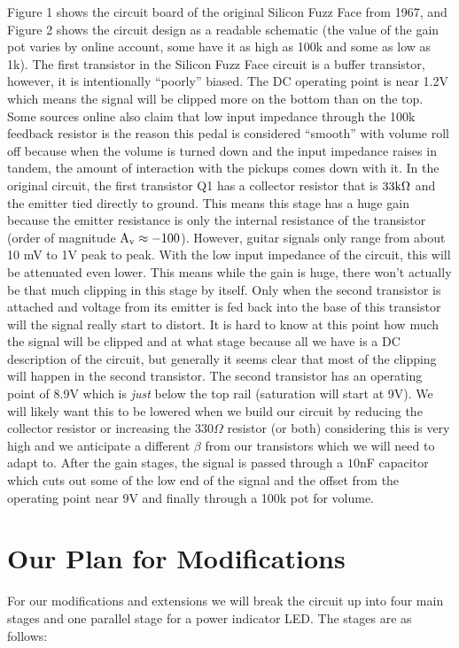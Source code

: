 \documentclass[11pt,twocolumn]{article}
\begin{document}
Figure 1 shows the circuit board of the original Silicon Fuzz Face from 1967, and Figure 2 shows the circuit design as a readable schematic (the value of the gain pot varies by online account, some have it as high as 100k and some as low as 1k). The first transistor in the Silicon Fuzz Face circuit is a buffer transistor, however, it is intentionally ``poorly'' biased. The DC operating point is near 1.2V which means the signal will be clipped more on the bottom than on the top. Some sources online also claim that low input impedance through the 100k feedback resistor is the reason this pedal is considered ``smooth'' with volume roll off because when the volume is turned down and the input impedance raises in tandem, the amount of interaction with the pickups comes down with it. In the original circuit, the first transistor Q1 has a collector resistor that is $\rm 33k\Omega$ and the emitter tied directly to ground. This means this stage has a huge gain because the emitter resistance is only the internal resistance of the transistor (order of magnitude $\rm A_v\approx -100$). However, guitar signals only range from about 10 mV to 1V peak to peak. With the low input impedance of the circuit, this will be attenuated even lower. This means while the gain is huge, there won't actually be that much clipping in this stage by itself. Only when the second transistor is attached and voltage from its emitter is fed back into the base of this transistor will the signal really start to distort. It is hard to know at this point how much the signal will be clipped and at what stage because all we have is a DC description of the circuit, but generally it seems clear that most of the clipping will happen in the second transistor. The second transistor has an operating point of 8.9V which is \textit{just} below the top rail (saturation will start at 9V). We will likely want this to be lowered when we build our circuit by reducing the collector resistor or increasing the 330$\Omega$ resistor (or both) considering this is very high and we anticipate a different $\beta$ from our transistors which we will need to adapt to. After the gain stages, the signal is passed through a $10$nF capacitor which cuts out some of the low end of the signal and the offset from the operating point near 9V and finally through a 100k pot for volume. 

\section{Our Plan for Modifications}
For our modifications and extensions we will break the circuit up into four main stages and one parallel stage for a power indicator LED\@. The stages are as follows:
\end{document}
